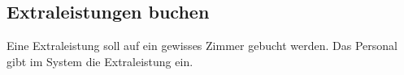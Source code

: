 \documentclass[../SubfileFeatures.tex]{subfiles}
\begin{document}
    \subsection{Extraleistungen buchen}
    Eine Extraleistung soll auf ein gewisses Zimmer gebucht werden.
    Das Personal gibt im System die Extraleistung ein.
\end{document}
